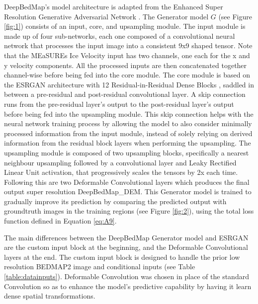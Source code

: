 \documentclass[tc, manuscript]{copernicus}
\begin{document}
DeepBedMap's model architecture is adapted from the Enhanced Super Resolution Generative Adversarial Network \citep[ESRGAN,][]{WangESRGANEnhancedSuperResolution2018}.
The Generator model $G$ (see Figure \ref{fig:1}) consists of an input, core, and upsampling module.
The input module is made up of four sub-networks, each one composed of a convolutional neural network that processes the input image into a consistent 9x9 shaped tensor.
Note that the MEaSUREs Ice Velocity \citep{MouginotMEaSUREsPhaseMap2019} input has two channels, one each for the x and y velocity components.
All the processed inputs are then concatenated together channel-wise before being fed into the core module.
The core module is based on the ESRGAN architecture with 12 Residual-in-Residual Dense Blocks \citep[see][for details]{WangESRGANEnhancedSuperResolution2018}, saddled in between a pre-residual and post-residual convolutional layer.
A skip connection runs from the pre-residual layer's output to the post-residual layer's output before being fed into the upsampling module.
This skip connection \citep{HeIdentityMappingsDeep2016} helps with the neural network training process by allowing the model to also consider minimally processed information from the input module, instead of solely relying on derived information from the residual block layers when performing the upsampling.
The upsampling module is composed of two upsampling blocks, specifically a nearest neighbour upsampling followed by a convolutional layer and Leaky Rectified Linear Unit \citep[LeakyReLU,][]{MaasRectifiernonlinearitiesimprove2013} activation, that progressively scales the tensors by 2x each time.
Following this are two Deformable Convolutional layers \citep{DaiDeformableConvolutionalNetworks2017} which produces the final output super resolution DeepBedMap\_DEM.
This Generator model is trained to gradually improve its prediction by comparing the predicted output with groundtruth images in the training regions (see Figure \ref{fig:2}), using the total loss function defined in Equation \eqref{eq:A9}.

The main differences between the DeepBedMap Generator model and ESRGAN are the custom input block at the beginning, and the Deformable Convolutional layers at the end.
The custom input block is designed to handle the prior low resolution BEDMAP2 image and conditional inputs (see Table \ref{table:datainputs}).
Deformable Convolution was chosen in place of the standard Convolution so as to enhance the model's predictive capability by having it learn dense spatial transformations.
\end{document}
